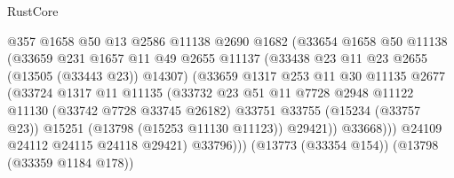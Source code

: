 \begin{lexlean}{RustCore}
\begin{coremodule}
                                  @357
                                  @1658
                                  @50
                                  @13
                                  @2586
                                  @11138
                                  @2690
                                  @1682
                                  (@33654
                                    @1658
                                    @50
                                    @11138
                                    (@33659
                                      @231
                                      @1657
                                      @11
                                      @49
                                      @2655
                                      @11137
                                      (@33438 @23 @11 @23 @2655 (@13505 (@33443 @23)) @14307)
                                      (@33659
                                        @1317
                                        @253
                                        @11
                                        @30
                                        @11135
                                        @2677
                                        (@33724
                                          @1317
                                          @11
                                          @11135
                                          (@33732
                                            @23
                                            @51
                                            @11
                                            @7728
                                            @2948
                                            @11122
                                            @11130
                                            (@33742 @7728 @33745 @26182)
                                            @33751
                                            @33755
                                            (@15234 (@33757 @23))
                                            @15251
                                            (@13798 (@15253 @11130 @11123))
                                            @29421))
                                        @33668)))
                                  @24109
                                  @24112
                                  @24115
                                  @24118
                                  @29421)
                                @33796)))
                          (@13773 (@33354 @154))
                          (@13798 (@33359 @1184 @178))

\end{coremodule}
\end{lexlean}
